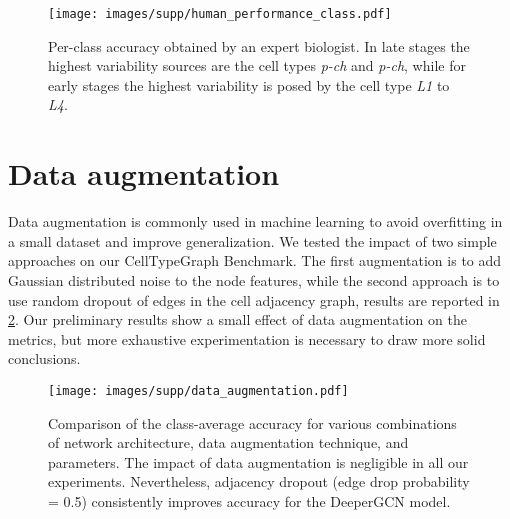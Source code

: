 \documentclass[10pt,twocolumn,letterpaper]{article}
\begin{document}
\begin{figure}
  \centering
  \texttt{[image: images/supp/human\_performance\_class.pdf]}
  \caption{Per-class accuracy obtained by an expert biologist. In late stages the highest variability sources are the cell types \textit{p-ch} and \textit{p-ch}, while for early stages the highest variability is posed by the cell type \textit{L1} to \textit{L4}.}
  \label{fig:hp_class}
\end{figure}

\section{Data augmentation}
\label{suppl:data_aug}
Data augmentation is commonly used in machine learning to avoid overfitting in a small dataset and improve generalization. We tested the impact of two simple approaches on our CellTypeGraph Benchmark. The first augmentation is to add Gaussian distributed noise to the node features, while the second approach is to use random dropout of edges in the cell adjacency graph, results are reported in \cref{fig:data_aug}. Our preliminary results show a small effect of data augmentation on the metrics, but more exhaustive experimentation is necessary to draw more solid conclusions.

\begin{figure}
  \centering
  \texttt{[image: images/supp/data\_augmentation.pdf]}
  \caption{Comparison of the class-average accuracy for various combinations of network architecture, data augmentation technique, and parameters. The impact of data augmentation is negligible in all our experiments. Nevertheless, adjacency dropout (edge drop probability = 0.5) consistently improves accuracy for the DeeperGCN model.}
  \label{fig:data_aug}
\end{figure}
\end{document}
